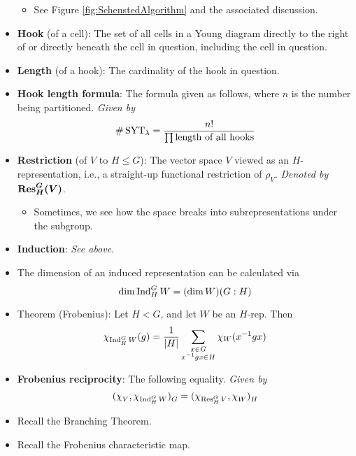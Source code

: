 \documentclass[../notes.tex]{subfiles}
\begin{document}
\begin{itemize}
\begin{itemize}
        \item See Figure \ref{fig:SchenstedAlgorithm} and the associated discussion.
    \end{itemize}
    \item \textbf{Hook} (of a cell): The set of all cells in a Young diagram directly to the right of or directly beneath the cell in question, including the cell in question.
    \item \textbf{Length} (of a hook): The cardinality of the hook in question.
    \item \textbf{Hook length formula}: The formula given as follows, where $n$ is the number being partitioned. \emph{Given by}
    \begin{equation*}
        \#\operatorname{SYT}_\lambda = \frac{n!}{\prod\text{length of all hooks}}
    \end{equation*}
    \item \textbf{Restriction} (of $V$ to $H\leq G$): The vector space $V$ viewed as an $H$-representation, i.e., a straight-up functional restriction of $\rho_V$. \emph{Denoted by} $\bm{\res_H^G(V)}$.
    \begin{itemize}
        \item Sometimes, we see how the space breaks into subrepresentations under the subgroup.
    \end{itemize}
    \item \textbf{Induction}: \emph{See above}.
    \item The dimension of an induced representation can be calculated via
    \begin{equation*}
        \dim\operatorname{Ind}_H^GW = (\dim W)(G:H)
    \end{equation*}
    \item Theorem (Frobenius): Let $H<G$, and let $W$ be an $H$-rep. Then
    \begin{equation*}
        \chi_{\operatorname{Ind}_H^GW}(g) = \frac{1}{|H|}\sum_{\substack{x\in G\\x^{-1}gx\in H}}\chi_W(x^{-1}gx)
    \end{equation*}
    \item \textbf{Frobenius reciprocity}: The following equality. \emph{Given by}
    \begin{equation*}
        (\chi_V^{},\chi_{\operatorname{Ind}_H^GW})_G^{} = (\chi_{\operatorname{Res}_H^GV},\chi_W^{})_H^{}
    \end{equation*}
    \item Recall the Branching Theorem.
    \item Recall the Frobenius characteristic map.

\end{itemize}
\end{document}

